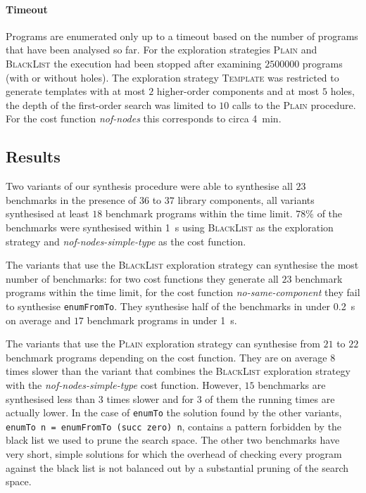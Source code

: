 \paragraph{Timeout} Programs are enumerated only up to a timeout based on the number of programs that have been analysed so far. For the exploration strategies \textsc{Plain} and \textsc{BlackList} the execution had been stopped after examining $2500000$ programs (with or without holes). The exploration strategy \textsc{Template} was restricted to generate templates with at most $2$ higher-order components and at most $5$ holes, the depth of the first-order search was limited to $10$ calls to the \textsc{Plain} procedure. For the cost function \textit{nof-nodes} this corresponds to circa \SI{4}{min}.

\subsection{Results}\label{Table summary}
Two variants of our synthesis procedure were able to synthesise all $23$ benchmarks in the presence of $36$ to $37$ library components, all variants synthesised at least $18$ benchmark programs within the time limit. $78\%$ of the benchmarks were synthesised within \SI{1}{s} using \textsc{BlackList} as the exploration strategy and \textit{nof-nodes-simple-type} as the cost function.

The variants that use the \textsc{BlackList} exploration strategy can synthesise the most number of benchmarks: for two cost functions they generate all $23$ benchmark programs within the time limit, for the cost function \textit{no-same-component} they fail to synthesise \lstinline?enumFromTo?. They synthesise half of the benchmarks in under \SI{0.2}{s} on average and $17$ benchmark programs in under \SI{1}{s}.

The variants that use the \textsc{Plain} exploration strategy can synthesise from $21$ to $22$ benchmark programs depending on the cost function. They are on average $8$ times slower than the variant that combines the \textsc{BlackList} exploration strategy with the \textit{nof-nodes-simple-type} cost function. However, $15$ benchmarks are synthesised less than $3$ times slower and for $3$ of them the running times are actually lower. In the case of \lstinline?enumTo? the solution found by the other variants, \lstinline?enumTo n = enumFromTo (succ zero) n?, contains a pattern forbidden by the black list we used to prune the search space. The other two benchmarks have very short, simple solutions for which the overhead of checking every program against the black list is not balanced out by a substantial pruning of the search space.

